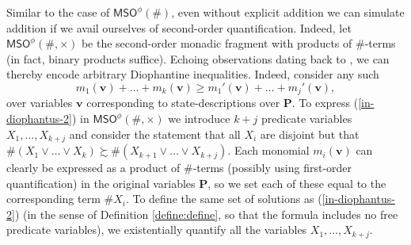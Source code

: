 \documentclass[12pt,oneside,reqno]{amsart}
\theoremstyle{definition}
\begin{document}
Similar to the case of $\mathsf{MSO}^\phi(\#)$, even without explicit addition we can simulate addition if we avail ourselves of second-order quantification. Indeed, let $\mathsf{MSO}^\phi(\#,\times)$ be the second-order monadic fragment with products of $\#$-terms (in fact, binary products suffice). Echoing observations dating back to \cite{Skolem}, we can thereby encode arbitrary Diophantine inequalities. Indeed, consider any such
\begin{equation} m_1(\mathbf{v}) + \dots + m_k(\mathbf{v}) \geq m_1'(\mathbf{v}) + \dots + m_j'(\mathbf{v}), \label{in-diophantus-2}\end{equation} over variables $\mathbf{v}$ corresponding to state-descriptions over $\mathbf{P}$. To express (\ref{in-diophantus-2}) in $\mathsf{MSO}^\phi(\#,\times)$ we introduce $k+j$ predicate variables $X_1,\dots,X_{k+j}$ and consider the statement that all $X_i$ are disjoint but that $\#(X_1 \vee \dots \vee X_k) \succsim \#(X_{k+1} \vee \dots \vee X_{k+j})$. Each monomial $m_i(\mathbf{v})$ can clearly be expressed as a product of $\#$-terms (possibly using first-order quantification) in the original variables $\mathbf{P}$, so we set each of these equal to the corresponding term $\# X_i$. %
To define the same set of solutions as (\ref{in-diophantus-2}) (in the sense of Definition \ref{define:define}, so that the formula includes no free predicate variables), we existentially quantify all the variables $X_1,\dots,X_{k+j}$. 
\end{document}
